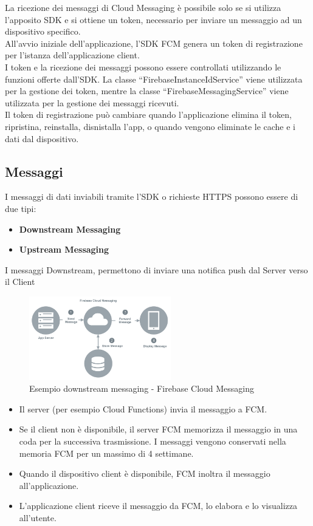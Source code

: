 \newpage
La ricezione dei messaggi di Cloud Messaging è possibile solo se si utilizza l'apposito SDK e si ottiene un token, necessario per inviare un messaggio ad un dispositivo specifico.\\
All'avvio iniziale dell'applicazione, l'SDK FCM genera un token di registrazione per l'istanza dell'applicazione client.\\
I token e la ricezione dei messaggi possono essere controllati utilizzando le funzioni offerte dall'SDK.
La classe ``FirebaseInstanceIdService'' viene utilizzata per la gestione dei token, mentre la classe ``FirebaseMessagingService'' viene utilizzata per la gestione dei messaggi ricevuti.\\
Il token di registrazione può cambiare quando l'applicazione elimina il token, ripristina, reinstalla, disnistalla l'app, o quando vengono eliminate le cache e i dati dal dispositivo.


\subsection{Messaggi}
I messaggi di dati inviabili tramite l'SDK o richieste HTTPS possono essere di due tipi:
\begin{itemize}
    \item \textbf{Downstream Messaging}
    \item \textbf{Upstream Messaging}
\end{itemize}

I messaggi Downstream, permettono di inviare una notifica push dal Server verso il Client

\begin{figure}[!hb]
  \centering
  \includegraphics[width=0.55\textwidth]{immagini/fcm_down.png}
  \caption{Esempio downstream messaging - Firebase Cloud Messaging}
  \label{fig:Esempio downstream messaging - Firebase Cloud Messaging}
\end{figure}


\begin{itemize}
    \item Il server (per esempio Cloud Functions) invia il messaggio a FCM.
    \item Se il client non è disponibile, il server FCM memorizza il messaggio in una coda per la successiva trasmissione. I messaggi vengono conservati nella memoria FCM per un massimo di 4 settimane.
    \item Quando il dispositivo client è disponibile, FCM inoltra il messaggio all'applicazione.
    \item L'applicazione client riceve il messaggio da FCM, lo elabora e lo visualizza all'utente.
\end{itemize}

